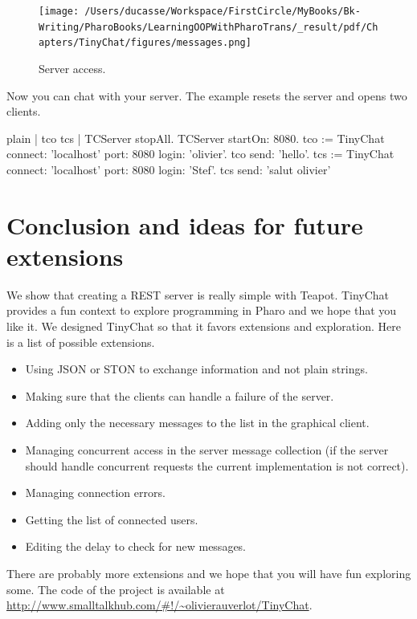 \documentclass[10pt,twoside,english]{_support/latex/sbabook/sbabook}
\begin{document}
\begin{figure}

\begin{center}
\texttt{[image: /Users/ducasse/Workspace/FirstCircle/MyBooks/Bk-Writing/PharoBooks/LearningOOPWithPharoTrans/\_result/pdf/Chapters/TinyChat/figures/messages.png]}\caption{Server access.\label{messages}}\end{center}
\end{figure}


Now you can chat with your server. The example resets the server and opens two clients.

\begin{displaycode}{plain}
| tco tcs |
TCServer stopAll.
TCServer startOn: 8080.
tco := TinyChat connect: 'localhost' port: 8080 login: 'olivier'.
tco send: 'hello'.
tcs := TinyChat connect: 'localhost' port: 8080 login: 'Stef'.	
tcs send: 'salut olivier'
\end{displaycode}
\section{Conclusion and ideas for future extensions}
We show that creating a REST server is really simple with Teapot. 
TinyChat provides a fun context to explore programming in Pharo and we hope that you like it. 
We designed TinyChat so that it favors extensions and exploration. Here is a list of possible extensions.

\begin{itemize}
\item Using JSON or STON to exchange information and not plain strings.
\item Making sure that the clients can handle a failure of the server.
\item Adding only the necessary messages to the list in the graphical client. 
\item Managing concurrent access in the server message collection (if the server should handle concurrent requests the current implementation is not correct).
\item Managing connection errors. 
\item Getting the list of connected users. 
\item Editing the delay to check for new messages. 
\end{itemize}

There are probably more extensions and we hope that you will have fun exploring some.  
The code of the project is available at  \url{http://www.smalltalkhub.com/#!/~olivierauverlot/TinyChat}.


\backmatter



\end{document}
